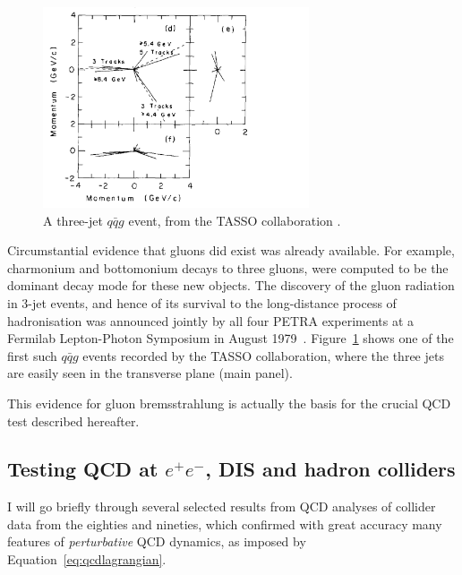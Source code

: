 \begin{figure}[t]
\begin{center}
  \includegraphics[width=0.7\textwidth]{Chapters/pQCD/qqg.png}
 \caption{A three-jet $q\bar{q}g$ event, from the TASSO collaboration \cite{wiik}.}
 \label{fig:gluonJet}
\end{center}
\end{figure}


Circumstantial evidence that gluons did exist was already
available. For example, charmonium and bottomonium decays to
three gluons, were computed to be the dominant decay mode for these
new objects. The discovery of the gluon radiation in 3-jet
events, and hence of its survival
to the long-distance process of hadronisation was announced jointly by
all four PETRA experiments at a Fermilab Lepton-Photon Symposium in
August 1979~\cite{tasso_g}. Figure~\ref{fig:gluonJet} shows one of the first such
$q\bar{q}g$ events recorded by the TASSO collaboration, where the three jets are easily seen in
the transverse plane (main panel).

This evidence for gluon bremsstrahlung is actually the basis for the
crucial QCD test described hereafter. 

\subsection{Testing QCD at \texorpdfstring{$e^{+}e^{-}$}{e+e-}, DIS
  and hadron colliders}
I will go briefly through several selected results from QCD analyses of
collider data from the eighties and nineties, which confirmed with
great accuracy many features of
\textit{perturbative}
QCD dynamics, as imposed by Equation~\ref{eq:qcdlagrangian}. 

